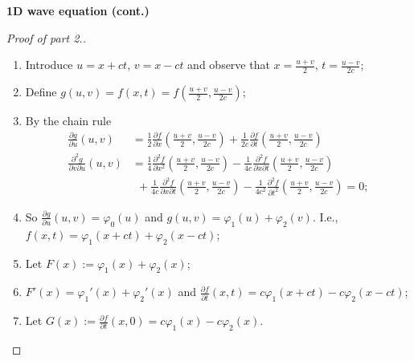 \textbf{1D wave equation (cont.)}
\begin{proof}[Proof of part 2.]
    \begin{enumerate}
        \item Introduce \(u = x + ct\), \(v=x-ct\)
              and observe that \(x = \frac{u+v}{2}\), \(t=\frac{u-v}{2c}\);
        \item Define \(g(u,v) = f(x,t) = f(   \frac{u+v}{2} , \frac{u-v}{2c} )\);
        \item By the chain rule
              \[
                  \begin{aligned}
                      \tfrac{\partial g}{\partial u}(u,v)
                       & = \tfrac{1}{2} \tfrac{\partial f}{\partial x}(   \tfrac{u+v}{2} , \tfrac{u-v}{2c} )
                      + \tfrac{1}{2c} \tfrac{\partial f}{\partial t}(   \tfrac{u+v}{2} , \tfrac{u-v}{2c} )                      \\
                      \tfrac{\partial^2 g}{\partial v \partial u}(u,v)
                       & = \tfrac{1}{4} \tfrac{\partial^2 f}{\partial x^2}(   \tfrac{u+v}{2} , \tfrac{u-v}{2c} )
                      - \tfrac{1}{4c} \tfrac{\partial^2 f}{\partial x\partial t}(   \tfrac{u+v}{2} , \tfrac{u-v}{2c} )          \\
                       & \ \ +  \tfrac{1}{4c} \tfrac{\partial^2 f}{\partial x \partial t}(   \tfrac{u+v}{2} , \tfrac{u-v}{2c} )
                      -  \tfrac{1}{4c^2} \tfrac{\partial^2 f}{\partial t^2}(   \tfrac{u+v}{2} , \tfrac{u-v}{2c} ) = 0;
                  \end{aligned}
              \]
        \item So \( \tfrac{\partial g}{\partial u}(u,v) = \varphi_0(u)\) and \(g(u,v) = \varphi_1(u) + \varphi_2(v)\).
              I.e., \(f(x,t) = \varphi_1(x+ct) + \varphi_2(x-ct)\);
        \item Let \(F(x) := \varphi_1(x) + \varphi_2(x)\);
        \item \(F'(x) = \varphi_1'(x) + \varphi_2'(x)\)
              and \(\frac{\partial f}{\partial t}(x,t) = c\varphi_1(x+ct) - c\varphi_2(x-ct)\);
        \item Let \(G(x) := \frac{\partial f}{\partial t}(x,0) = c\varphi_1(x) - c\varphi_2(x)\).
    \end{enumerate}
\end{proof}



